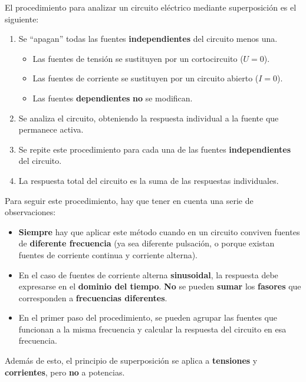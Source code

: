 \documentclass[11pt]{book} %
\numberwithin{dummy}{section}
\theoremstyle{ocrenumbox}
\theoremstyle{blacknumex}
\theoremstyle{blacknumbox}
\theoremstyle{ocrenum}
\newlength\esp
\begin{document}
El procedimiento para analizar un circuito eléctrico mediante superposición es el siguiente: 
\begin{enumerate}
\item Se ``apagan'' todas las fuentes \textbf{independientes} del circuito menos una.
    \begin{itemize}
    \item Las fuentes de tensión se sustituyen por un cortocircuito ($U = 0$).
    \item Las fuentes de corriente se sustituyen por un circuito abierto ($I = 0$).
    \item Las fuentes \textbf{dependientes} \textbf{no} se modifican.
    \end{itemize}
\item Se analiza el circuito, obteniendo la respuesta individual a la fuente que permanece activa.
\item Se repite este procedimiento para cada una de las fuentes \textbf{independientes} del circuito.
\item La respuesta total del circuito es la suma de las respuestas individuales.
\end{enumerate}

Para seguir este procedimiento, hay que tener en cuenta una serie de observaciones: 
\begin{itemize}
\item \textbf{Siempre} hay que aplicar este método cuando en un circuito conviven fuentes de \textbf{diferente frecuencia} (ya sea diferente pulsación, o porque existan fuentes de corriente continua y corriente alterna).
\item En el caso de fuentes de corriente alterna \textbf{sinusoidal}, la respuesta debe expresarse en el \textbf{dominio del tiempo}. \textbf{No} se pueden \textbf{sumar} los \textbf{fasores} que corresponden a \textbf{frecuencias diferentes}.
\item En el primer paso del procedimiento, se pueden agrupar las fuentes que funcionan a la misma frecuencia y calcular la respuesta del circuito en esa frecuencia.
\end{itemize}

Además de esto, el principio de superposición se aplica a \textbf{tensiones} y \textbf{corrientes}, pero \textbf{no} a potencias. 
\end{document}
